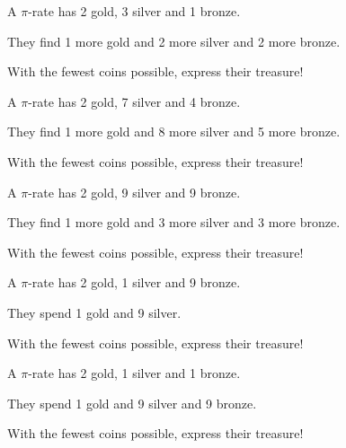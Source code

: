 \documentclass{article}
\begin{document}
\Huge
  
  A $\pi$-rate has 2 gold, 3 silver and 1 bronze.

  They find 1 more gold and 2 more silver and 2 more bronze.

  With the fewest coins possible, express their treasure!


\newpage

  A $\pi$-rate has 2 gold, 7 silver and 4 bronze.

  They find 1 more gold and 8 more silver and 5 more bronze.

  With the fewest coins possible, express their treasure!


\newpage

  A $\pi$-rate has 2 gold, 9 silver and 9 bronze.

  They find 1 more gold and 3 more silver and 3 more bronze.

  With the fewest coins possible, express their treasure!


\newpage




  A $\pi$-rate has 2 gold, 1 silver and 9 bronze.

  They spend 1 gold and  9 silver.

  With the fewest coins possible, express their treasure!


\newpage


  A $\pi$-rate has 2 gold, 1 silver and 1 bronze.

  They spend 1 gold and 9 silver and 9 bronze.

  With the fewest coins possible, express their treasure!
\end{document}

